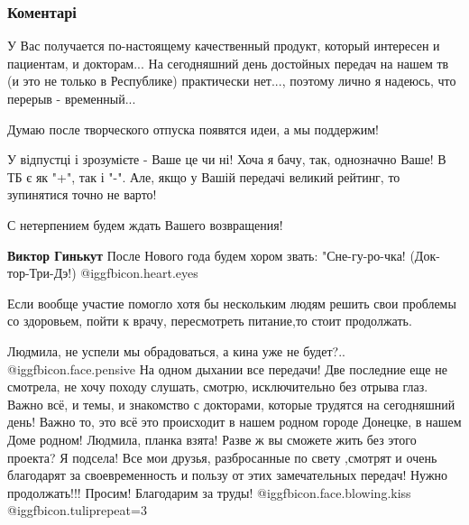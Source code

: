  
 
 
 
 
\subsubsection{Коментарі}

\begin{itemize} %

У Вас получается по-настоящему качественный продукт, который интересен и
пациентам, и докторам... На сегодняшний день достойных передач на нашем тв (и
это не только в Республике) практически нет..., поэтому лично я надеюсь, что
перерыв - временный...

Думаю после творческого отпуска появятся идеи, а мы поддержим!


У відпустці і зрозумієте - Ваше це чи ні! Хоча я бачу, так, однозначно Ваше! В
ТБ є як "+", так і "-". Але, якщо у Вашій передачі великий рейтинг, то
зупинятися точно не варто!

С нетерпением будем ждать Вашего возвращения!

\begin{itemize} %
\textbf{Виктор Гинькут} После Нового года будем хором звать: "Сне-гу-ро-чка! (Док-тор-Три-Дэ!)  @igg{fbicon.heart.eyes} 
\end{itemize} %

Если вообще участие помогло хотя бы нескольким людям решить свои проблемы со здоровьем, пойти к врачу, пересмотреть питание,то стоит продолжать.


Людмила, не успели мы обрадоваться, а кина уже не будет?..  @igg{fbicon.face.pensive}  На одном дыхании
все передачи! Две последние еще не смотрела, не хочу походу слушать, смотрю,
исключительно без отрыва глаз. Важно всё, и темы, и знакомство с докторами,
которые трудятся на сегодняшний день! Важно то, это всё это происходит в нашем
родном городе Донецке, в нашем Доме родном! Людмила, планка взята! Разве ж вы
сможете жить без этого проекта? Я подсела! Все мои друзья, разбросанные по
свету ,смотрят и очень благодарят за своевременность и пользу от этих
замечательных передач! Нужно продолжать!!! Просим! Благодарим за труды!
 @igg{fbicon.face.blowing.kiss}  @igg{fbicon.tulip}{repeat=3} 


\end{itemize}

